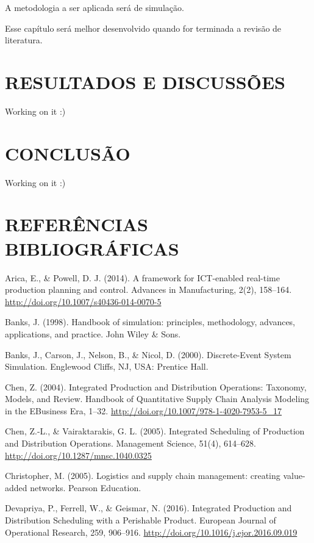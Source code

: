 \documentclass[
]{book}
\begin{document}
A metodologia a ser aplicada será de simulação.

Esse capítulo será melhor desenvolvido quando for terminada a revisão de literatura.

\hypertarget{resultados-e-discussuxf5es}{%
\chapter{RESULTADOS E DISCUSSÕES}\label{resultados-e-discussuxf5es}}

Working on it :)

\hypertarget{conclusuxe3o}{%
\chapter{CONCLUSÃO}\label{conclusuxe3o}}

Working on it :)

\hypertarget{referuxeancias-bibliogruxe1ficas}{%
\chapter*{REFERÊNCIAS BIBLIOGRÁFICAS}\label{referuxeancias-bibliogruxe1ficas}}

Arica, E., \& Powell, D. J. (2014). A framework for ICT-enabled real-time production planning and control. Advances in Manufacturing, 2(2), 158--164. \url{http://doi.org/10.1007/s40436-014-0070-5}

Banks, J. (1998). Handbook of simulation: principles, methodology, advances, applications, and practice. John Wiley \& Sons.

Banks, J., Carson, J., Nelson, B., \& Nicol, D. (2000). Discrete-Event System Simulation. Englewood Cliffs, NJ, USA: Prentice Hall.

Chen, Z. (2004). Integrated Production and Distribution Operations: Taxonomy, Models, and Review. Handbook of Quantitative Supply Chain Analysis Modeling in the EBusiness Era, 1--32. \url{http://doi.org/10.1007/978-1-4020-7953-5_17}

Chen, Z.-L., \& Vairaktarakis, G. L. (2005). Integrated Scheduling of Production and Distribution Operations. Management Science, 51(4), 614--628. \url{http://doi.org/10.1287/mnsc.1040.0325}

Christopher, M. (2005). Logistics and supply chain management: creating value-added networks. Pearson Education.

Devapriya, P., Ferrell, W., \& Geismar, N. (2016). Integrated Production and Distribution Scheduling with a Perishable Product. European Journal of Operational Research, 259, 906--916. \url{http://doi.org/10.1016/j.ejor.2016.09.019}
\end{document}
